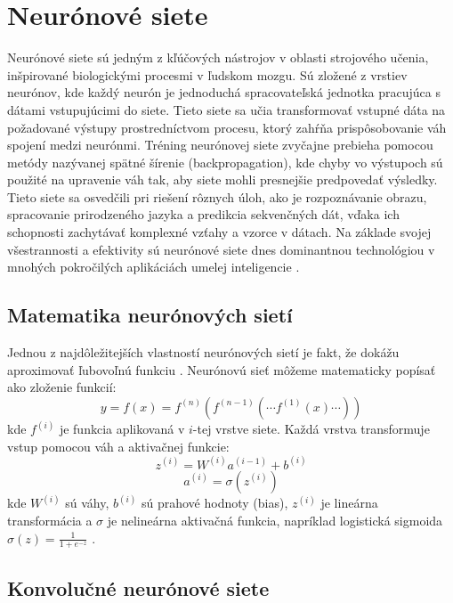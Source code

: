 \section{Neurónové siete}
\label{sec:neuronove_siete}

Neurónové siete sú jedným z kľúčových nástrojov v oblasti strojového učenia, inšpirované biologickými procesmi v ľudskom mozgu. Sú zložené z vrstiev neurónov, kde každý neurón je jednoduchá spracovateľská jednotka pracujúca s dátami vstupujúcimi do siete. Tieto siete sa učia transformovať vstupné dáta na požadované výstupy prostredníctvom procesu, ktorý zahŕňa prispôsobovanie váh spojení medzi neurónmi. Tréning neurónovej siete zvyčajne prebieha pomocou metódy nazývanej spätné šírenie (backpropagation), kde chyby vo výstupoch sú použité na upravenie váh tak, aby siete mohli presnejšie predpovedať výsledky. Tieto siete sa osvedčili pri riešení rôznych úloh, ako je rozpoznávanie obrazu, spracovanie prirodzeného jazyka a predikcia sekvenčných dát, vďaka ich schopnosti zachytávať komplexné vzťahy a vzorce v dátach. Na základe svojej všestrannosti a efektivity sú neurónové siete dnes dominantnou technológiou v mnohých pokročilých aplikáciách umelej inteligencie \cite{artificial_intelligence_modern_aproach, end_to_end_self_driving}.

\subsection{Matematika neurónových sietí}

Jednou z najdôležitejších vlastností neurónových sietí je fakt, že dokážu aproximovať ľubovoľnú funkciu \cite{artificial_intelligence_modern_aproach}. Neurónovú sieť môžeme matematicky popísať ako zloženie funkcií:
\[
y = f(x) = f^{(n)}(f^{(n-1)}(\cdots f^{(1)}(x)\cdots))
\]
kde $f^{(i)}$ je funkcia aplikovaná v $i$-tej vrstve siete. Každá vrstva transformuje vstup pomocou váh a aktivačnej funkcie:
\[
z^{(i)} = W^{(i)} a^{(i-1)} + b^{(i)}
\]
\[
a^{(i)} = \sigma(z^{(i)})
\]
kde $W^{(i)}$ sú váhy, $b^{(i)}$ sú prahové hodnoty (bias), $z^{(i)}$ je lineárna transformácia a $\sigma$ je nelineárna aktivačná funkcia, napríklad logistická sigmoida $\sigma(z) = \frac{1}{1 + e^{-z}}$ \cite{artificial_intelligence_modern_aproach}.

\subsection{Konvolučné neurónové siete}

